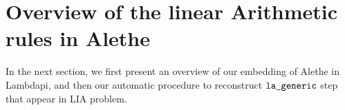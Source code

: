
\section{Overview of the linear Arithmetic rules in Alethe}


In the next section, we first present an overview of our embedding of Alethe in Lambdapi, and then our automatic procedure to reconstruct $\tt{la\_generic}$ step that appear in LIA problem.
